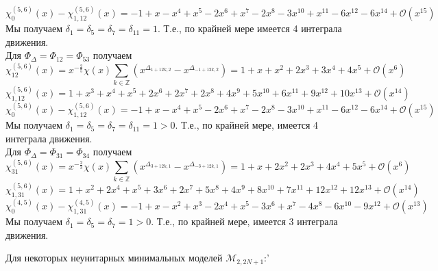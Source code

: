 \documentclass[12pt]{article}
\theoremstyle{definition}
\begin{document}
\begin{itemize}
\begin{equation}
    \end{equation}
    \begin{equation}
        \chi^{(5,6)}_0(x)-\chi^{(5,6)}_{1,12}(x)=-1+x-x^4+x^5-2x^6+x^7-2x^8-3x^{10}+x^{11}-6x^{12}-6x^{14}+\mathcal{O}(x^{15})
    \end{equation}
    Мы получаем $\delta_1=\delta_5=\delta_7=\delta_{11}=1$. Т.е., по крайней мере имеется 4 интеграла движения.\\
    Для $\Phi_\Delta=\Phi_{12}=\Phi_{53}$ получаем
    \begin{equation}
        \chi^{(5,6)}_{12}(x)=x^{-\frac{2}{5}}\chi(x)\sum\limits_{k\in\mathbb{Z}}(x^{\Delta_{1+12k,2}}-x^{\Delta_{-1+12k,2}})=1+x+x^2+2x^3+3x^4+4x^5+\mathcal{O}(x^6)
    \end{equation}
    \begin{equation}
        \chi^{(5,6)}_{1,12}(x)=1+x^3+x^4+x^5+2x^6+2x^7+2x^8+4x^9+5x^{10}+6x^{11}+9x^{12}+10x^{13}+\mathcal{O}(x^{14})
    \end{equation}
    \begin{equation}
        \chi^{(5,6)}_0(x)-\chi^{(5,6)}_{1,12}(x)=-1+x-x^4+x^5-2x^6+x^7-2x^8-3x^{10}+x^{11}-6x^{12}-6x^{14}+\mathcal{O}(x^{15})
    \end{equation}
    Мы получаем $\delta_1=\delta_5=\delta_7=\delta_{11}=1>0$. Т.е., по крайней мере, имеется 4 интеграла движения.\\
    Для $\Phi_\Delta=\Phi_{31}=\Phi_{34}$ получаем
    \begin{equation}
        \chi^{(5,6)}_{31}(x)=x^{-\frac{2}{3}}\chi(x)\sum\limits_{k\in\mathbb{Z}}(x^{\Delta_{3+12k,1}}-x^{\Delta_{-3+12k,1}})=1+x+2x^2+2x^3+4x^4+5x^5+\mathcal{O}(x^6)
    \end{equation}
    \begin{equation}
        \chi^{(5,6)}_{1,31}(x)=1+x^2+2x^4+x^5+3x^6+2x^7+5x^8+4x^9+8x^{10}+7x^{11}+12x^{12}+12x^{13}+\mathcal{O}(x^{14})
    \end{equation}
    \begin{equation}
        \chi^{(4,5)}_0(x)-\chi^{(4,5)}_{1,31}(x)=-1+x-x^2+x^3-2x^4+x^5-3x^6+x^7-4x^8-6x^{10}-9x^{12}+\mathcal{O}(x^{13})
    \end{equation}
    Мы получаем $\delta_1=\delta_5=\delta_7=1>0$. Т.е., по крайней мере, имеется 3 интеграла движения.
\end{itemize}
Для некоторых неунитарных минимальных моделей $\mathcal{M}_{2,2N+1}$:'
\end{document}
